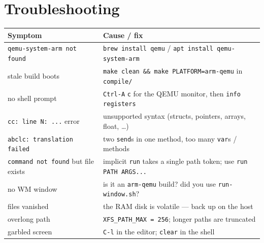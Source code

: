 \documentclass[a4paper,11pt]{article}
\begin{document}
\section{Troubleshooting}
\begin{center}\footnotesize
\begin{longtable}{@{}p{5.0cm} p{8.4cm}@{}}
\toprule \textbf{Symptom} & \textbf{Cause / fix}\\ \midrule \endhead
\verb|qemu-system-arm not found| & \verb|brew install qemu| / \verb|apt install qemu-system-arm|\\
stale build boots & \verb|make clean && make PLATFORM=arm-qemu| in \verb|compile/|\\
no shell prompt & \verb|Ctrl-A| \textrightarrow{} \verb|c| for the QEMU monitor, then \verb|info registers|\\
\verb|cc: line N: ...| error & unsupported syntax (structs, pointers, arrays, float, \dots)\\
\verb|abclc: translation failed| & two \verb|send|s in one method, too many \verb|var|s / methods\\
\verb|command not found| but file exists & implicit \verb|run| takes a single path token; use \verb|run PATH ARGS...|\\
no WM window & is it an \verb|arm-qemu| build? did you use \verb|run-window.sh|?\\
files vanished & the RAM disk is volatile --- back up on the host\\
overlong path & \verb|XFS_PATH_MAX = 256|; longer paths are truncated\\
garbled screen & \verb|C-l| in the editor; \verb|clear| in the shell\\
\bottomrule
\end{longtable}
\end{center}

\end{document}
